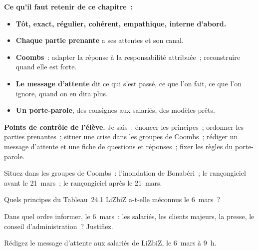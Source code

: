 \begin{boxresume}
\textbf{Ce qu'il faut retenir de ce chapitre~:}
\begin{itemize}
    \item \textbf{Tôt, exact, régulier, cohérent, empathique, interne
          d'abord.}
    \item \textbf{Chaque partie prenante} a ses attentes et son canal.
    \item \textbf{Coombs}~: adapter la réponse à la responsabilité
          attribuée~; reconstruire quand elle est forte.
    \item \textbf{Le message d'attente} dit ce qui s'est passé, ce que l'on
          fait, ce que l'on ignore, quand on en dira plus.
    \item \textbf{Un porte-parole}, des consignes aux salariés, des modèles
          prêts.
\end{itemize}
\end{boxresume}

\begin{boxinfo}
\textbf{Points de contrôle de l'élève.} Je sais~: énoncer les principes~;
ordonner les parties prenantes~; situer une crise dans les groupes de
Coombs~; rédiger un message d'attente et une fiche de questions et
réponses~; fixer les règles du porte-parole.
\end{boxinfo}

\bigskip

\begin{boxexo}[title={\ding{45}\quad Exercice~24.1. Quel groupe~? \niveaubase}]
Situez dans les groupes de Coombs~: l'inondation de Bonabéri~; le
rançongiciel avant le 21~mars~; le rançongiciel après le 21~mars.
\end{boxexo}

\begin{boxexo}[title={\ding{45}\quad Exercice~24.2. Les principes \niveaubase}]
Quels principes du Tableau~24.1 LiZbiZ a-t-elle méconnus le 6~mars~?
\end{boxexo}

\begin{boxexo}[title={\ding{45}\quad Exercice~24.3. L'ordre \niveaubase}]
Dans quel ordre informer, le 6~mars~: les salariés, les clients majeurs,
la presse, le conseil d'administration~? Justifiez.
\end{boxexo}

\begin{boxexo}[title={\ding{45}\quad Exercice~24.4. Un message d'attente \niveaumoyen}]
Rédigez le message d'attente aux salariés de LiZbiZ, le 6~mars à 9~h.
\end{boxexo}

